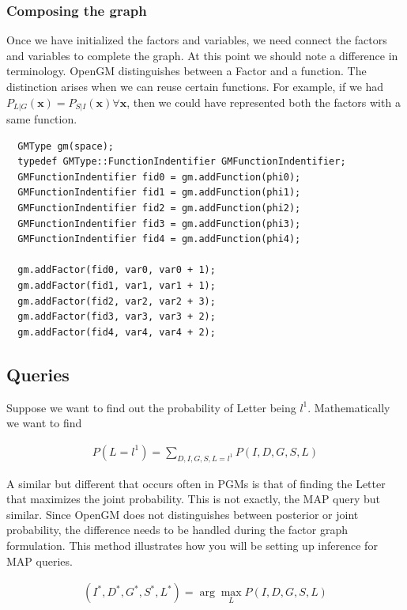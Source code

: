 \documentclass[12pt,oneside,letterpaper]{article}
\begin{document}
\subsubsection{Composing the graph}

Once we have initialized the factors and variables, we need connect the factors
and variables to complete the graph. At this point we should note a
difference in terminology. OpenGM distinguishes between a Factor and a
function.  The distinction arises when we can reuse certain functions. For
example, if we had $P_{L|G}(\mathbf{x}) = P_{S|I}(\mathbf{x}) \forall
\mathbf{x}$, then we could have represented both the factors with a same
function.

\begin{lstlisting}
  GMType gm(space);
  typedef GMType::FunctionIndentifier GMFunctionIndentifier;
  GMFunctionIndentifier fid0 = gm.addFunction(phi0);
  GMFunctionIndentifier fid1 = gm.addFunction(phi1);
  GMFunctionIndentifier fid2 = gm.addFunction(phi2);
  GMFunctionIndentifier fid3 = gm.addFunction(phi3);
  GMFunctionIndentifier fid4 = gm.addFunction(phi4);

  gm.addFactor(fid0, var0, var0 + 1);
  gm.addFactor(fid1, var1, var1 + 1);
  gm.addFactor(fid2, var2, var2 + 3);
  gm.addFactor(fid3, var3, var3 + 2);
  gm.addFactor(fid4, var4, var4 + 2);
\end{lstlisting}


\subsection{Queries}
Suppose we want to find out the probability of Letter being $l^1$.
Mathematically we want to find

\begin{align}
  P(L = l^1) = \sum_{D,I,G,S,L=l^1} P(I, D, G, S, L)
  \label{eq:marginal}
\end{align}

A similar but different that occurs often in PGMs is that of finding the Letter
that maximizes the joint probability. This is not exactly, the MAP query but
similar. Since OpenGM does not distinguishes between posterior or joint
probability, the difference needs to be handled during the factor graph
formulation. This method illustrates how you will be setting up inference for
MAP queries. 

\begin{align}
  (I^*, D^*, G^*, S^*, L^*)  = \arg \max_{L} P(I, D, G, S, L)
  \label{eq:map}
\end{align}
\end{document}
